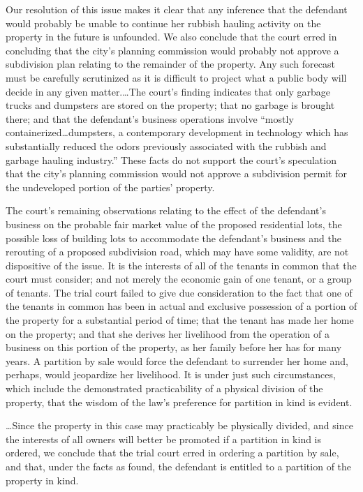 Our resolution of this issue makes it clear that any inference that the
defendant would probably be unable to continue her rubbish hauling activity on
the property in the future is unfounded. We also conclude that the court erred
in concluding that the city's planning commission would probably not approve a
subdivision plan relating to the remainder of the property. Any such forecast
must be carefully scrutinized as it is difficult to project what a public body
will decide in any given matter.\dots The court's finding indicates that
only garbage trucks and dumpsters are stored on the property; that no garbage
is brought there; and that the defendant's business operations involve ``mostly
containerized\dots dumpsters, a contemporary development in technology which
has substantially reduced the odors previously associated with the rubbish and
garbage hauling industry.'' These facts do not support the court's speculation
that the city's planning commission would not approve a subdivision permit for
the undeveloped portion of the parties' property.

The court's remaining observations relating to the effect of the defendant's
business on the probable fair market value of the proposed residential lots,
the possible loss of building lots to accommodate the defendant's
business and the rerouting of a
proposed subdivision road, which may have some validity, are not dispositive of
the issue. It is the interests of all of the tenants in common that the court
must consider; and not merely the economic gain of one tenant, or a group of
tenants. The trial court failed to give due consideration to the fact that one
of the tenants in common has been in actual and exclusive possession of a
portion of the property for a substantial period of time; that the tenant has
made her home on the property; and that she derives her livelihood from the
operation of a business on this portion of the property, as her family before
her has for many years. A partition by sale would force the defendant to
surrender her home and, perhaps, would jeopardize her livelihood. It is under
just such circumstances, which include the demonstrated practicability of a
physical division of the property, that the wisdom of the law's preference for
partition in kind is evident.

\dots Since the property in this case may practicably be physically divided,
and since the interests of all owners will better be promoted if a partition in
kind is ordered, we conclude that the trial court erred in ordering a partition
by sale, and that, under the facts as found, the defendant is entitled to a
partition of the property in kind.

